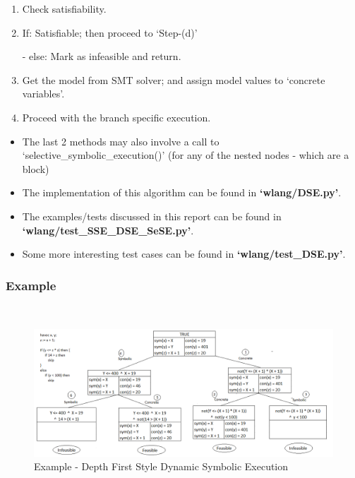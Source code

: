 \documentclass[11pt]{llncs}
\begin{document}
\begin{enumerate}
\begin{enumerate}
						\item Check satisfiability.

						\item If:  Satisfiable; then proceed to ‘Step-(d)’

						          - else: Mark as infeasible and  return.

						\item Get the model from SMT solver;  and  assign model values to ‘concrete variables’.
						\item Proceed with the branch specific execution.
					\end{enumerate}
					
				\vspace{0.5mm}
			\end{enumerate}


			\begin{itemize}
				\item  The last 2 methods may also involve a call to ‘selective\_symbolic\_execution()’ (for any of the nested nodes - which are a block)

				\vspace{2mm}

				\item The implementation of this algorithm can be found in \textbf{‘wlang/DSE.py’}.
				\item The examples/tests discussed in this report can be found in \textbf{‘wlang/test\_SSE\_DSE\_SeSE.py’}.
				\item Some more interesting test cases can be found in \textbf{‘wlang/test\_DSE.py’}.
			\end{itemize}

		\subsubsection{Example}
			~\vspace{-4mm}
			\begin{figure}[H]
				\includegraphics[width=1.05\textwidth] {DSE_DFS_Example.png}
				\caption{Example - Depth First Style Dynamic Symbolic Execution} \label{fig_6}
			\end{figure}
\end{document}
